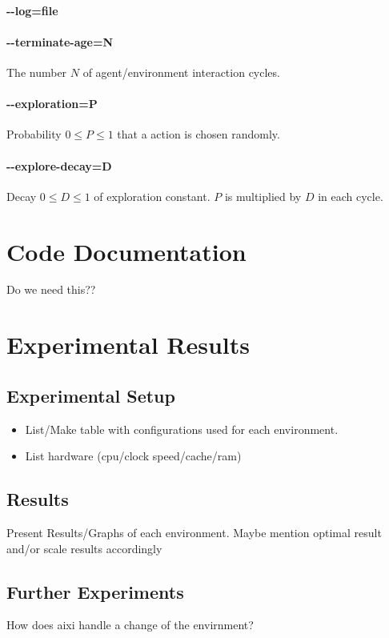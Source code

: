 \documentclass[paper=a4, fontsize=11pt]{scrartcl} %
\numberwithin{equation}{section} %
\numberwithin{figure}{section} %
\numberwithin{table}{section} %
\begin{document}
\paragraph{-{}-log=file}
\paragraph{-{}-terminate-age=N} The number $N$ of agent/environment interaction cycles.
\paragraph{-{}-exploration=P} Probability $0 \leq P \leq 1$ that a action is chosen randomly.
\paragraph{-{}-explore-decay=D} Decay $0 \leq D \leq 1$ of exploration constant. $P$ is multiplied by $D$ in each cycle.

\section{Code Documentation}
Do we need this??

\section{Experimental Results}
\subsection{Experimental Setup}

\begin{itemize}
    \item List/Make table with configurations used for each environment.
    \item List hardware (cpu/clock speed/cache/ram)
\end{itemize}

\subsection{Results}
Present Results/Graphs of each environment. Maybe mention optimal result and/or scale results accordingly

\subsection{Further Experiments}
How does aixi handle a change of the envirnment?
\end{document}
